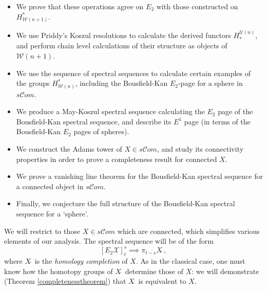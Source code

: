 \documentclass[11pt]{amsart} \renewcommand{\baselinestretch}{1.4}
\theoremstyle{plain}
\theoremstyle{definition}
\newcommand{\scrC}{\mathscr{C}}
\newcommand{\calX}{\mathcal{X}}
\newcommand{\calw}{\mathcal{W}}
\newcommand{\calu}{\mathcal{U}}
\newcommand{\algs}{{\scrC\!\textit{om}}}
\newcommand{\E}[5]{[E^{#1}_{#2}#3]^{#4}_{#5}}
\begin{document}
\begin{Introduction}
\begin{itemize}
\item We prove that these operations agree on $E_2$ with those constructed on $H^*_{\calw(n+1)}$.
\item We use Priddy's Koszul resolutions to calculate the derived functors $H_*^{\calu(n)}$, and perform chain level calculations of their structure as objects of $\calw(n+1)$.
\item We use the sequence of spectral sequences to calculate certain examples of the groups $H^*_{\calw(n)}$, including the Bousfield-Kan $E_2$-page for a sphere in $s\algs$.
\item We produce a May-Koszul spectral sequence calculating the $E_2$ page of the Bousfield-Kan spectral sequence, and describe its $E^1$ page (in terms of the Bousfield-Kan $E_2$ pages of spheres).
\item We construct the Adams tower of $X\in s\algs$, and study its connectivity properties in order to prove a completeness result for connected $X$.
\item We prove a vanishing line theorem for the Bousfield-Kan spectral sequence for a connected object in $s\algs$.
\item Finally, we conjecture the full structure of the Bousfield-Kan spectral sequence for a `sphere'.
\end{itemize}

%
%



We will restrict to those $X\in s\algs$ which are connected, which simplifies various elements of our analysis.
The spectral sequence will be of the form
\[\E{}{2}{\calX}{s}{t} \implies \pi_{t-s}X\hat{\ },\]
where $X\hat{\ }$ is the \emph{homology completion} of $X$. As in the classical case, one must know how the homotopy groups of $X\hat{\ }$ determine those of $X$: we will demonstrate (Theorem \ref{completenesstheorem}) that $X\hat{\ }$ is equivalent to $X$.


\end{Introduction}
\end{document}
